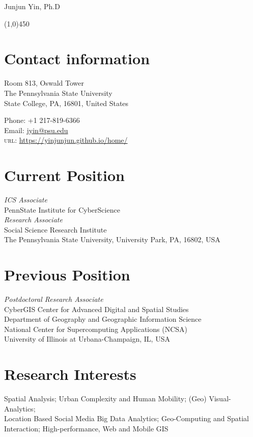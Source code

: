 \documentclass[11pt, a4paper]{article}
\begin{document}
{\LARGE Junjun Yin, Ph.D}
\begin{center}
\line(1,0){450}
\end{center}
\section*{Contact information}

\begin{multicols}{2}
 \begin{flushleft}
Room 813, Oswald Tower\\
The Pennsylvania State University\\
State College, PA, 16801, United States
\end{flushleft}
\columnbreak
\begin{flushright}
Phone: +1 217-819-6366\\[.1cm]
Email: \href{mailto:a.jyin@psu.edu}{jyin@psu.edu}\\[.1cm]
\textsc{url}: \href{https://yinjunjun.github.io/home/}{https://yinjunjun.github.io/home/}
\end{flushright}
\end{multicols}

\section*{Current Position}
\emph{ICS Associate}\\
PennState Institute for CyberScience\\

\emph{Research Associate}\\
Social Science Research Institute\\
The Pennsylvania State University, University Park, PA, 16802, USA\\

\section*{Previous Position}
\emph{Postdoctoral Research Associate}\\
CyberGIS Center for Advanced Digital and Spatial Studies\\
Department of Geography and Geographic Information Science\\
National Center for Supercomputing Applications (NCSA)\\
University of Illinois at Urbana-Champaign, IL, USA

\section*{Research Interests}
Spatial Analysis; Urban Complexity and Human Mobility; (Geo) Visual-Analytics; \\
Location Based Social Media Big Data Analytics; Geo-Computing and Spatial Interaction; High-performance, Web and Mobile GIS
\end{document}
